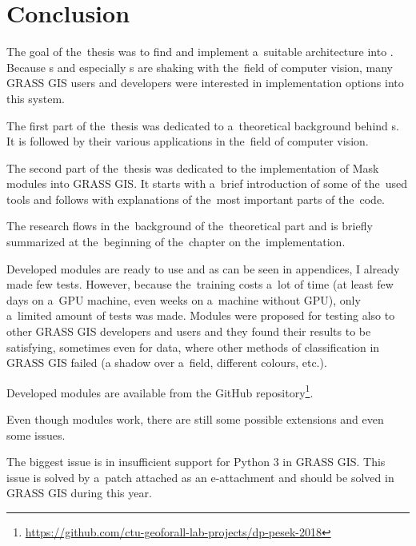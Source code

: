 \chapter{Conclusion}
\label{conclusion}

The goal of the~thesis was to find and implement a~suitable  
architecture into  . Because s and especially 
s are shaking with the~field of computer vision, many GRASS GIS users 
and developers were interested in implementation options into this system.

The first part of the~thesis was dedicated to a~theoretical background behind 
s. It is followed by their various applications in the~field of computer 
vision. 

The second part of the~thesis was dedicated to the implementation of Mask
 modules into GRASS GIS. It starts with a~brief introduction of some
of the~used tools and follows with explanations of the~most important parts of
the~code.

The research flows in the~background of the~theoretical part and is briefly 
summarized at the~beginning of the~chapter on the~implementation.

Developed modules are ready to use and as can be seen in appendices, I already 
made few tests. However, because the~training costs a~lot of time (at least few 
days on a~GPU machine, even weeks on a~machine without GPU), only a~limited 
amount of tests was made. Modules were proposed for testing also to other GRASS 
GIS developers and users and they found their results to be satisfying, 
sometimes even for data, where other methods of classification in GRASS GIS 
failed (a shadow over a~field, different colours, etc.).

Developed modules are available from the GitHub
repository\footnote{\url{https://github.com/ctu-geoforall-lab-projects/dp-pesek-2018}}.

Even though modules work, there are still some possible extensions and even
some issues.

The biggest issue is in insufficient support for Python 3 in GRASS GIS. This 
issue is solved by a~patch attached as an e-attachment and should be solved in 
GRASS GIS during this year.

